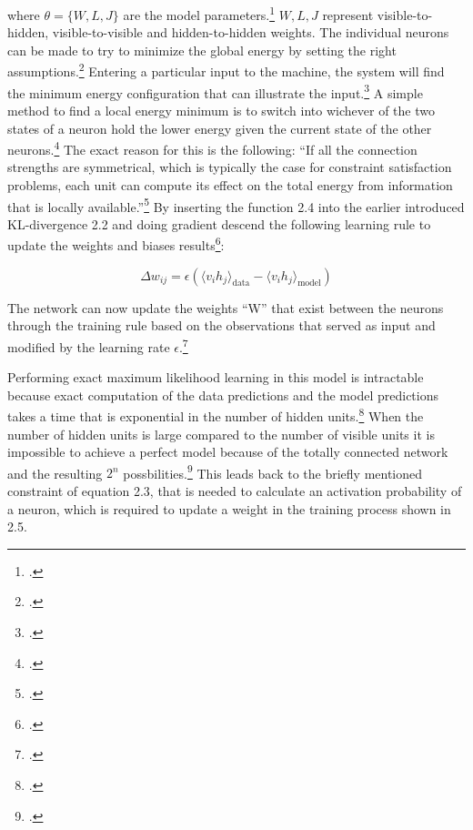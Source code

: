 where \( \theta = \{W, L, J\} \) are the model parameters.\footcite[Vgl.][448]{salakhutdinovDeepBoltzmannMachines2009}
\( W, L, J \) represent visible-to-hidden, visible-to-visible and hidden-to-hidden weights.
The individual neurons can be made to try to minimize the global energy by setting the right assumptions.\footcite[Vgl.][150]{ackleyLearningAlgorithmBoltzmann1985}
Entering a particular input to the machine, the system will find the minimum energy configuration that can illustrate the input.\footcite[Vgl.][150]{ackleyLearningAlgorithmBoltzmann1985}
A simple method to find a local energy minimum is to switch into wichever of the two states of a neuron hold the lower energy given the current state of the other neurons.\footcite[Vgl.][110]{fahlmanMassivelyParallelArchitectures1983}  
The exact reason for this is the following: ``If all the connection strengths are
symmetrical, which is typically the case for constraint satisfaction
problems, each unit can compute its effect on the total energy from
information that is locally available.''\footcite[110]{fahlmanMassivelyParallelArchitectures1983}  
By inserting the function 2.4 into the earlier introduced KL-divergence 2.2 and doing gradient descend the following learning rule to update the weights and biases results\footcite[Vgl.][5]{hintonPracticalGuideTraining2012}:

\begin{equation}
    \Delta w_{ij} = \epsilon ( \langle v_i h_j \rangle_{\text{data}} - \langle v_i h_j \rangle_{\text{model}} )
\end{equation}

The network can now update the weights ``W'' that exist between the neurons through the training rule based on the observations that served as input and modified by the learning rate \(\epsilon\).\footcite[Vgl.][1-2]{barraEquivalenceHopfieldNetworks2012}

Performing exact maximum likelihood learning in this model is intractable because exact computation of the data predictions and the model predictions takes a time that is exponential in the number of hidden units.\footcite[Vgl.][449]{salakhutdinovDeepBoltzmannMachines2009}
When the number of hidden units is large compared to the number of visible units it is impossible to achieve a perfect model because of the totally connected network and the resulting \( 2^n \) possbilities.\footcite[Vgl.][154]{ackleyLearningAlgorithmBoltzmann1985}
This leads back to the briefly mentioned constraint of equation 2.3, that is needed to calculate an activation probability of a neuron, which is required to update a weight in the training process shown in 2.5.

